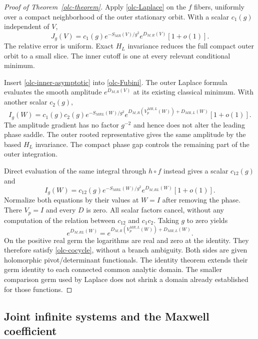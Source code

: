\begin{proof}[Proof of Theorem~\ref{olc-theorem}]
Apply \eqref{olc-Laplace} on the $f$ fibers, uniformly over
a compact neighborhood of the outer stationary orbit.
With a scalar $c_1(g)$ independent of $V$,
\begin{equation}
 J_g(V)=c_1(g)e^{-S_{MR}(V)/g^2}
                   e^{D_{M,R}(V)}[1+o(1)] .
 \label{olc-inner-asymptotic}
\end{equation}
The relative error is uniform. Exact $H_L$ invariance reduces
the full compact outer orbit to a small slice. The inner
cutoff is one at every relevant conditional minimum.

Insert \eqref{olc-inner-asymptotic} into
\eqref{olc-Fubini}. The outer Laplace formula evaluates the
smooth amplitude $e^{D_{M,R}(V)}$ at its existing classical
minimum. With another scalar $c_2(g)$,
\begin{equation}
 I_g(W)=c_1(g)c_2(g)e^{-S_{MRL}(W)/g^2}
       e^{D_{M,R}(V_p^{MR,L}(W))+D_{MR,L}(W)}[1+o(1)] .
 \label{olc-sequential-asymptotic}
\end{equation}
The amplitude gradient has no factor $g^{-2}$ and hence
does not alter the leading phase saddle. The outer rooted
representative gives the same amplitude by the based
$H_L$ invariance. The compact phase gap controls the
remaining part of the outer integration.

Direct evaluation of the same integral through $h\circ f$
instead gives a scalar $c_{12}(g)$ and
\begin{equation}
 I_g(W)=c_{12}(g)e^{-S_{MRL}(W)/g^2}
                         e^{D_{M,RL}(W)}[1+o(1)] .
 \label{olc-direct-asymptotic}
\end{equation}
Normalize both equations by their values at $W=I$ after
removing the phase. There $V_p=I$ and every $D$ is zero.
All scalar factors cancel, without any computation of the
relation between $c_{12}$ and $c_1c_2$. Taking $g$ to zero
yields
\[
 e^{D_{M,RL}(W)}
   =e^{D_{M,R}(V_p^{MR,L}(W))+D_{MR,L}(W)} .
\]
On the positive real germ the logarithms are real and
zero at the identity. They therefore satisfy
\eqref{olc-cocycle}, without a branch ambiguity.
Both sides are given holomorphic pivot/determinant
functionals. The identity theorem extends their germ
identity to each connected common analytic domain.
The smaller comparison germ used by Laplace does not
shrink a domain already established for those functions.
\end{proof}

\subsection{Joint infinite systems and the Maxwell coefficient}
\label{olc-limit-section}

